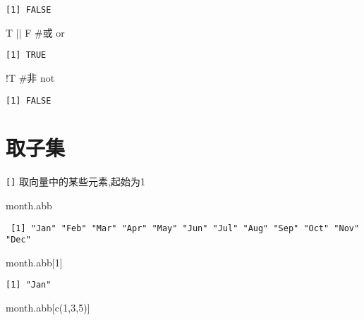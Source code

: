 \documentclass[
  letterpaper,
  DIV=11,
  numbers=noendperiod]{scrreprt}
\newenvironment{Shaded}{\begin{snugshade}}{\end{snugshade}}
\newcommand{\CommentTok}[1]{\textcolor[rgb]{0.37,0.37,0.37}{#1}}
\newcommand{\DecValTok}[1]{\textcolor[rgb]{0.68,0.00,0.00}{#1}}
\newcommand{\FunctionTok}[1]{\textcolor[rgb]{0.28,0.35,0.67}{#1}}
\newcommand{\NormalTok}[1]{\textcolor[rgb]{0.00,0.23,0.31}{#1}}
\newcommand{\SpecialCharTok}[1]{\textcolor[rgb]{0.37,0.37,0.37}{#1}}
\begin{document}
\begin{verbatim}
[1] FALSE
\end{verbatim}

\begin{Shaded}
\begin{Highlighting}[]
\NormalTok{T }\SpecialCharTok{||}\NormalTok{ F }\CommentTok{\#或 or}
\end{Highlighting}
\end{Shaded}

\begin{verbatim}
[1] TRUE
\end{verbatim}

\begin{Shaded}
\begin{Highlighting}[]
\SpecialCharTok{!}\NormalTok{T }\CommentTok{\#非 not}
\end{Highlighting}
\end{Shaded}

\begin{verbatim}
[1] FALSE
\end{verbatim}

\section{取子集}\label{ux53d6ux5b50ux96c6}

\texttt{{[}{]}} 取向量中的某些元素,起始为1

\begin{Shaded}
\begin{Highlighting}[]
\NormalTok{month.abb}
\end{Highlighting}
\end{Shaded}

\begin{verbatim}
 [1] "Jan" "Feb" "Mar" "Apr" "May" "Jun" "Jul" "Aug" "Sep" "Oct" "Nov" "Dec"
\end{verbatim}

\begin{Shaded}
\begin{Highlighting}[]
\NormalTok{month.abb[}\DecValTok{1}\NormalTok{]}
\end{Highlighting}
\end{Shaded}

\begin{verbatim}
[1] "Jan"
\end{verbatim}

\begin{Shaded}
\begin{Highlighting}[]
\NormalTok{month.abb[}\FunctionTok{c}\NormalTok{(}\DecValTok{1}\NormalTok{,}\DecValTok{3}\NormalTok{,}\DecValTok{5}\NormalTok{)]}
\end{Highlighting}
\end{Shaded}
\end{document}
